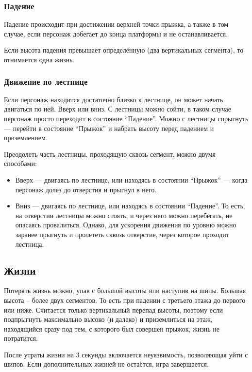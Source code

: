 \documentclass[12pt,a4paper,fullpage]{article}
\begin{document}
\subsubsection{Падение}
Падение происходит при достижении верхней точки прыжка, а также в том случае, если персонаж добегает до конца платформы и не останавливается.

Если высота падения превышает определённую (два вертикальных сегмента), то отнимается одна жизнь.\\

\subsubsection{Движение по лестнице}
Если персонаж находится достаточно близко к лестнице, он может начать двигаться по ней. Вверх или вниз. С лестницы можно сойти, в таком случае персонаж просто переходит в состояние ``Падение''. Можно с лестницы спрыгнуть --- перейти в состояние ``Прыжок'' и набрать высоту перед падением и приземлением.

Преодолеть часть лестницы, проходящую сквозь сегмент, можно двумя способами:
\begin{itemize}
\item Вверх --- двигаясь по лестнице, или находясь в состоянии ``Прыжок'' --- когда персонаж долез до отверстия и прыгнул в него.
\item Вниз --- двигаясь по лестнице, или находясь в состоянии ``Падение''. То есть, на отверстии лестницы можно стоять, и через него можно перебегать, не опасаясь провалиться. Однако, для ускорения движения по уровню можно заранее прыгнуть и пролететь сквозь отверстие, через которое проходит лестница.\\
\end{itemize}

\subsection{Жизни}
Потерять жизнь можно, упав с большой высоты или наступив на шипы. Большая высота -- более двух сегментов. То есть при падении с третьего этажа до первого или ниже. Считается только вертикальный перепад высоты, поэтому если подпрыгнуть максимально высоко (и далеко) и приземлиться на этаж, находящийся сразу под тем, с которого был совершён прыжок, жизнь не потратится.

После утраты жизни на 3 секунды включается неуязвимость, позволяющая уйти с шипов. Если дополнительных жизней не остаётся, игра завершается.\\
\end{document}
